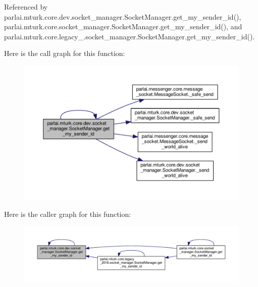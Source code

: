 Referenced by parlai.\+mturk.\+core.\+dev.\+socket\+\_\+manager.\+Socket\+Manager.\+get\+\_\+my\+\_\+sender\+\_\+id(), parlai.\+mturk.\+core.\+socket\+\_\+manager.\+Socket\+Manager.\+get\+\_\+my\+\_\+sender\+\_\+id(), and parlai.\+mturk.\+core.\+legacy\+\_.\+socket\+\_\+manager.\+Socket\+Manager.\+get\+\_\+my\+\_\+sender\+\_\+id().

Here is the call graph for this function\+:
\nopagebreak
\begin{figure}[H]
\begin{center}
\leavevmode
\includegraphics[width=350pt]{classparlai_1_1mturk_1_1core_1_1dev_1_1socket__manager_1_1SocketManager_a5445dd4fe36e2aff2efb2d73c998abcb_cgraph}
\end{center}
\end{figure}
Here is the caller graph for this function\+:
\nopagebreak
\begin{figure}[H]
\begin{center}
\leavevmode
\includegraphics[width=350pt]{classparlai_1_1mturk_1_1core_1_1dev_1_1socket__manager_1_1SocketManager_a5445dd4fe36e2aff2efb2d73c998abcb_icgraph}
\end{center}
\end{figure}
\mbox{\label{classparlai_1_1mturk_1_1core_1_1dev_1_1socket__manager_1_1SocketManager_afc9c7c9efb6fe26e981902f6c02557ee}} 
